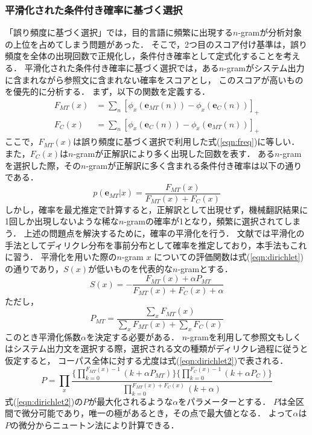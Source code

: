 \documentclass[japanese]{jnlp_1.4}
\begin{document}
\subsubsection{平滑化された条件付き確率に基づく選択}

「誤り頻度に基づく選択」では，目的言語に頻繁に出現する$n$-gramが分析対象の上位を占めてしまう問題があった．
そこで，2つ目のスコア付け基準は，誤り頻度を全体の出現回数で正規化し，条件付き確率として定式化することを考える．
平滑化された条件付き確率に基づく選択では，ある$n$-gramがシステム出力に含まれながら参照文に含まれない確率をスコアとし，
このスコアが高いものを優先的に分析する．
まず，以下の関数を定義する．
\begin{align*}
F_{MT}(x) & = \sum_n \left [ \phi_x(\boldsymbol{e}_{MT}(n)) - \phi_x(\boldsymbol{e}_{C}(n)) \right ]_+ \\
F_{C}(x) & = \sum_n \left [ \phi_x(\boldsymbol{e}_{C}(n)) - \phi_x(\boldsymbol{e}_{MT}(n)) \right ]_+ 
\end{align*}
ここで，$F_{MT}(x)$は誤り頻度に基づく選択で利用した式(\ref{eqn:freq})に等しい．
また，$F_{C}(x)$は$n$-gramが正解訳により多く出現した回数を表す．
ある$n$-gramを選択した際，その$n$-gramが正解訳に多く含まれる条件付き確率は以下の通りである．
\begin{equation}
p(\boldsymbol{e}_{MT}|x) = \frac{F_{MT}(x)}{F_{MT}(x) + F_{C}(x)}
\end{equation}
しかし，確率を最尤推定で計算すると，正解訳として出現せず，機械翻訳結果に1回しか出現しないような稀な$n$-gramの確率が1となり，頻繁に選択されてしまう．
上述の問題点を解決するために，確率の平滑化を行う．
文献\cite{mackay95hdlm}では平滑化の手法としてディリクレ分布を事前分布として確率を推定しており，本手法もこれに習う．
平滑化を用いた際の$n$-gram $x$ についての評価関数は式(\ref{eqn:dirichlet})の通りであり，$S(x)$が低いものを代表的な$n$-gramとする．
\begin{equation}
S(x) = -\frac{F_{MT}(x) + \alpha P_{MT}}{F_{MT}(x) + F_{C}(x) + \alpha} \label{eqn:dirichlet}
\end{equation}
ただし，
\[
P_{MT} = \frac{\sum_x F_{MT}(x)}{\sum_x F_{MT}(x) + \sum_x F_{C}(x)}
\]
このとき平滑化係数$\alpha$を決定する必要がある．
$n$-gramを利用して参照文もしくはシステム出力文を選択する際，選択される文の種類がディリクレ過程に従うと仮定すると，
コーパス全体に対する尤度は式(\ref{eqn:dirichlet2})で表される．
\begin{equation}
P = \prod_x \frac{\{ \prod_{k=0}^{F_{MT}(x)-1} (k + \alpha P_{MT}) \} \{ \prod_{k=0}^{F_{C}(x)-1} (k + \alpha P_{C}) \}}{\prod_{k=0}^{F_{MT}(x)+F_{C}(x)} (k + \alpha)} \label{eqn:dirichlet2}
\end{equation}
式(\ref{eqn:dirichlet2})の$P$が最大化されるような$\alpha$をパラメーターとする．
\pagebreak
$P$は全区間で微分可能であり，唯一の極があるとき，その点で最大値となる．
よって$\alpha$は$P$の微分からニュートン法により計算できる．
\end{document}
